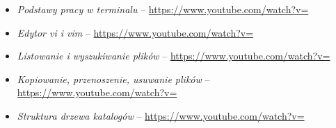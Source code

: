 % 
% 
% 
% 

\begin{itemize}
\item \emph{Podstawy pracy w terminalu} – \url{https://www.youtube.com/watch?v=}
\item \emph{Edytor vi i vim} – \url{https://www.youtube.com/watch?v=}
\item \emph{Listowanie i wyszukiwanie plików} – \url{https://www.youtube.com/watch?v=}
\item \emph{Kopiowanie, przenoszenie, usuwanie plików} – \url{https://www.youtube.com/watch?v=}
\item \emph{Struktura drzewa katalogów} – \url{https://www.youtube.com/watch?v=}
\end{itemize}
